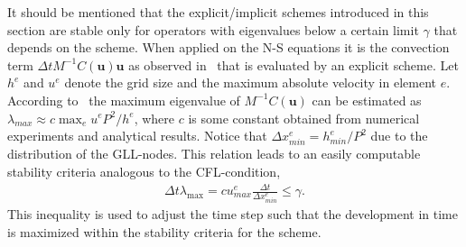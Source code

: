 


It should be mentioned that the explicit/implicit schemes introduced in this section are 
stable only for operators with eigenvalues below a certain limit $\gamma$ that depends 
on the scheme. When applied on the N-S 
equations it is the convection term $\Delta t M^{-1}C(\mathbf{u})\mathbf{u}$
as observed in~ that is evaluated by
an explicit scheme. Let $h^e$ and $u^e$ denote the grid size and the maximum absolute velocity in element $e$.
According to~\cite{Karniadakis} the maximum eigenvalue of $M^{-1}C(\mathbf{u})$ can be estimated as
$\lambda_{max} \approx c\max_e u^e P^2/h^e$, where $c$ is some constant obtained from numerical 
experiments and analytical results. Notice that $\Delta x^e_{min} = h^e_{min}/P^{2}$ due to the distribution of 
the GLL-nodes. This relation leads to an easily computable stability criteria analogous to the CFL-condition,
%
\begin{align}
    \Delta t \lambda_{\max} = cu^e_{max}\frac{\Delta t}{\Delta x^e_{min}} \le \gamma.
    \label{eq:restriction}
\end{align}
%
This inequality is used to adjust the time step such that the development in time is maximized
within the stability criteria for the scheme.

